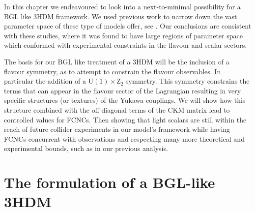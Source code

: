 In this chapter we endeavoured to look into a next-to-minimal possibility for a BGL like 3HDM framework. 
%
%
We used previous work to narrow down the vast parameter space of these type of models offer, see \cite{Ferreira_2018,Ivanov_2012,Ivanov_2016,Aranda_2017}.
%
Our conclusions are consistent with these studies, where it was found to have large regions of parameter space which conformed with experimental constraints in the flavour and scalar sectors.

The basis for our BGL like treatment of a 3HDM will be the inclusion of a flavour symmetry, as to attempt to constrain the flavour observables. In particular the addition of a $\mathrm{U}(1) \times \mathrm{Z}_2$ symmetry.
% 
This symmetry constrains the terms that can appear in the flavour sector of the Lagrangian resulting in very specific structures (or textures) of the Yukawa couplings.
% 
We will show how this structure combined with the off diagonal terms of the CKM matrix lead to controlled values for FCNCs. 
%
%
Then showing that light scalars are still within the reach of future collider experiments in our model's framework while having FCNCs concurrent with observations and respecting many more theoretical and experimental bounds, such as in our previous analysis. 
%
%
%

\section{The formulation of a BGL-like 3HDM} 

